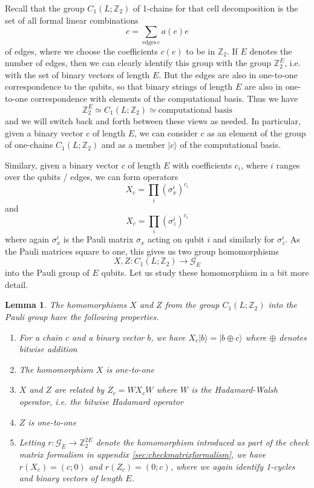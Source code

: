 \documentclass[a4paper, draft]{article}
\theoremstyle{own}
\newtheorem{lem}[thm]{Lemma}
\theoremstyle{remark}
\newcommand{\Z}{\mathbb{Z}}
\begin{document}
Recall that the group $C_1(L;\Z_2)$ of 1-chains for that cell decomposition is the set of all formal linear combinations
$$
c = \sum_{\text{edges} \, e} a(e) e
$$
of edges, where we choose the coefficients $c(e)$ to be in $\Z_2$. If $E$ denotes the number of edges, then we can clearly identify this group with the group $\Z_2^E$, i.e. with the set of binary vectors of length $E$. But the edges are also in one-to-one correspondence to the qubits, so that binary strings of length $E$ are also in one-to-one correspondence with elements of the computational basis. Thus we have
$$
\Z_2^E \simeq C_1(L ; \Z_2) \simeq \text{computational basis}
$$
and we will switch back and forth between these views as needed. In particular, given a binary vector $c$ of length $E$, we can consider $c$ as an element of the group of one-chains $C_1(L; \Z_2)$ and as a member $|c \rangle$ of the computational basis. 

Similary, given a binary vector $c$ of length $E$ with coefficients $c_i$, where $i$ ranges over the qubits / edges, we can form operators
$$
X_c = \prod_i (\sigma_{x}^i)^{c_i}
$$
and 
$$
X_c = \prod_i (\sigma_{z}^i)^{c_i}
$$
where again $\sigma_x^i$ is the Pauli matrix $\sigma_x$ acting on qubit $i$ and similarly for $\sigma_z^i$. As the Pauli matrices square to one, this gives us two group homomorphisms
$$
X, Z \colon C_1(L;\Z_2) \rightarrow \mathcal{G}_E
$$
into the Pauli group of $E$ qubits. Let us study these homomorphism in a bit more detail.

\begin{lem}
The homomorphisms $X$ and $Z$ from the group $C_1(L;\Z_2)$ into the Pauli group have the following properties.
\begin{enumerate}
	\item For a chain $c$ and a binary vector $b$, we have $X_c|b \rangle = |b \oplus c \rangle$ where $\oplus$ denotes bitwise addition
	\item The homomorphism $X$ is one-to-one
	\item $X$ and $Z$ are related by $Z_c = W X_c W$ where $W$ is the Hadamard-Walsh operator, i.e. the bitwise Hadamard operator
	\item $Z$ is one-to-one
	\item Letting $r \colon \mathcal{G}_E \rightarrow \Z_2^{2E}$ denote the homomorphism introduced as part of the check matrix formalism in appendix \ref{sec:checkmatrixformalism}, we have $r(X_c) = (c ; 0)$ and $r(Z_c) = (0 ; c)$, where we again identify 1-cycles and binary vectors of length $E$.
\end{enumerate}
\end{lem}
\end{document}
